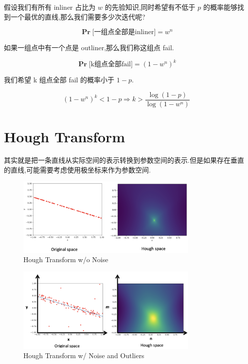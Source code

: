 假设我们有所有 inliner 占比为 $w$ 的先验知识,同时希望有不低于 $p$ 的概率能够找到一个最优的直线,那么我们需要多少次迭代呢?

\begin{equation}
\mathbf{\Pr}\text{[一组点全部是inliner]} = w^n
\end{equation}

如果一组点中有一个点是 outliner,那么我们称这组点 fail.

\begin{equation}
\mathbf{\Pr}\text{[k组点全部fail]} = {(1-w^n)}^k
\end{equation}

我们希望 k 组点全部 fail 的概率小于 $1-p$.

\begin{equation}
{(1-w^{n})}^k < 1-p
\Rightarrow
k > \frac{\log(1-p)}{\log(1-w^n)}
\end{equation}

\section{Hough Transform}

其实就是把一条直线从实际空间的表示转换到参数空间的表示.但是如果存在垂直的直线,可能需要考虑使用极坐标来作为参数空间.

\begin{figure}[htbp]
    \centering
    \includegraphics[width=0.8\textwidth]{figures/hough1.png}
    \caption{Hough Transform w/o Noise}
\end{figure}

\begin{figure}[htbp]
    \centering
    \includegraphics[width=0.8\textwidth]{figures/hough2.png}
    \caption{Hough Transform w/ Noise and Outliers}
\end{figure}